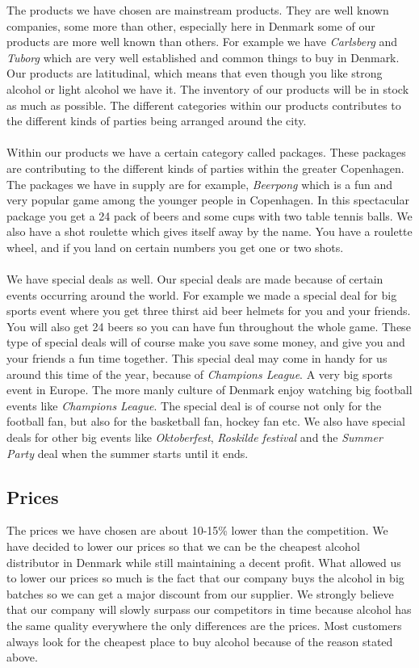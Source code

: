 \documentclass[12p]{article}
\begin{document}
The products we have chosen are mainstream products. They are well known companies, some more than other, especially here in Denmark some of our products are more well known than others. For example we have \emph{Carlsberg} and \emph{Tuborg} which are very well established and common things to buy in Denmark. Our products are latitudinal, which means that even though you like strong alcohol or light alcohol we have it. The inventory of our products will be in stock as much as possible. The different categories within our products contributes to the different kinds of parties being arranged around the city. 
\\ \\
Within our products we have a certain category called packages. These packages are contributing to the different kinds of parties within the greater Copenhagen. The packages we have in supply are for example, \emph{Beerpong} which is a fun and very popular game among the younger people in Copenhagen. In this spectacular package you get a 24 pack of beers and some cups with two table tennis balls. We also have a shot roulette which gives itself away by the name. You have a roulette wheel, and if you land on certain numbers you get one or two shots. 
\\ \\
We have special deals as well. Our special deals are made because of certain events occurring around the world. For example we made a special deal for big sports event where you get three thirst aid beer helmets for you and your friends. You will also get 24 beers so you can have fun throughout the whole game. These type of special deals will of course make you save some money, and give you and your friends a fun time together. This special deal may come in handy for us around this time of the year, because of \emph{Champions League}. A very big sports event in Europe. The more manly culture of Denmark enjoy watching big football events like \emph{Champions League}. The special deal is of course not only for the football fan, but also for the basketball fan, hockey fan etc. We also have special deals for other big events like \emph{Oktoberfest}, \emph{Roskilde festival} and the \emph{Summer Party} deal when the summer starts until it ends. 

\subsection{Prices}

The prices we have chosen are about 10-15\% lower than the competition. We have decided to lower our prices so that we can be the cheapest alcohol distributor in Denmark while still maintaining a decent profit. What allowed us to lower our prices so much is the fact that our company buys the alcohol in big batches so we can get a major discount from our supplier. We strongly believe that our company will slowly surpass our competitors in time because alcohol has the same quality everywhere the only differences are the prices. Most customers always look for the cheapest place to buy alcohol because of the reason stated above.
\end{document}
